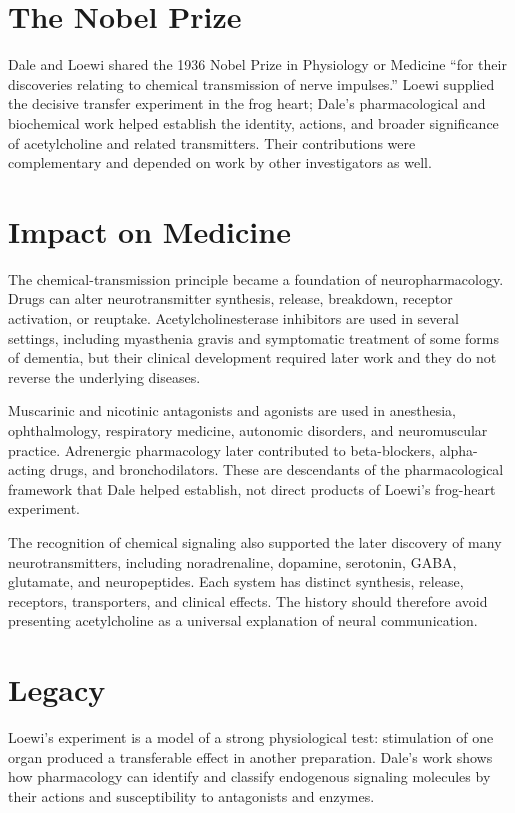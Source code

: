 \section{The Nobel Prize}

Dale and Loewi shared the 1936 Nobel Prize in Physiology or Medicine ``for their discoveries relating to chemical transmission of nerve impulses.'' Loewi supplied the decisive transfer experiment in the frog heart; Dale's pharmacological and biochemical work helped establish the identity, actions, and broader significance of acetylcholine and related transmitters. Their contributions were complementary and depended on work by other investigators as well.

\section{Impact on Medicine}

The chemical-transmission principle became a foundation of neuropharmacology. Drugs can alter neurotransmitter synthesis, release, breakdown, receptor activation, or reuptake. Acetylcholinesterase inhibitors are used in several settings, including myasthenia gravis and symptomatic treatment of some forms of dementia, but their clinical development required later work and they do not reverse the underlying diseases.

Muscarinic and nicotinic antagonists and agonists are used in anesthesia, ophthalmology, respiratory medicine, autonomic disorders, and neuromuscular practice. Adrenergic pharmacology later contributed to beta-blockers, alpha-acting drugs, and bronchodilators. These are descendants of the pharmacological framework that Dale helped establish, not direct products of Loewi's frog-heart experiment.

The recognition of chemical signaling also supported the later discovery of many neurotransmitters, including noradrenaline, dopamine, serotonin, GABA, glutamate, and neuropeptides. Each system has distinct synthesis, release, receptors, transporters, and clinical effects. The history should therefore avoid presenting acetylcholine as a universal explanation of neural communication.

\section{Legacy}

Loewi's experiment is a model of a strong physiological test: stimulation of one organ produced a transferable effect in another preparation. Dale's work shows how pharmacology can identify and classify endogenous signaling molecules by their actions and susceptibility to antagonists and enzymes.

